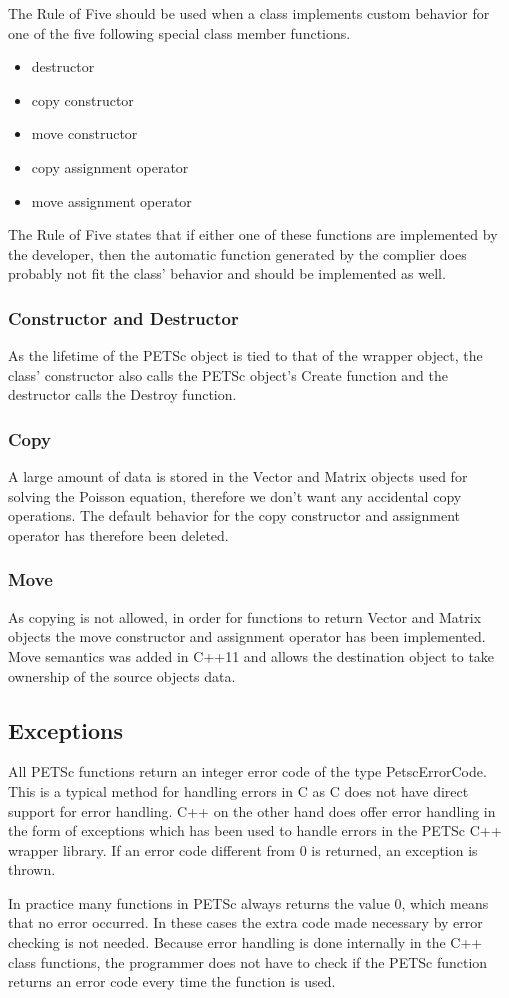 The Rule of Five should be used when a class implements custom behavior for one
of the five following special class member functions.
\begin{itemize}
	\item destructor
	\item copy constructor
	\item move constructor
	\item copy assignment operator
	\item move assignment operator
\end{itemize}
The Rule of Five states that if either one of these functions are implemented by
the developer, then the automatic function generated by the complier does
probably not fit the class' behavior and should be implemented as well.

\subsubsection{Constructor and Destructor}

As the lifetime of the PETSc object is tied to that of the wrapper object,
the class' constructor also calls the PETSc object's Create function and the 
destructor calls the Destroy function. 

\subsubsection{Copy}

A large amount of data is stored in the Vector and Matrix objects used for solving the
Poisson equation, therefore we don't want any accidental copy operations.
The default behavior for the copy constructor and assignment operator has
therefore been deleted.

\subsubsection{Move}

As copying is not allowed, in order for functions to return Vector and Matrix
objects the move constructor and assignment operator has been implemented.
Move semantics was added in C++11 and allows the destination object to take
ownership of the source objects data.

\subsection{Exceptions}

All PETSc functions return an integer error code of the type PetscErrorCode.
This is a typical method for handling errors in C as C does not have direct
support for error handling. C++ on the other hand does offer error handling in
the form of exceptions which has been used to handle errors in the PETSc C++
wrapper library. If an error code different from 0 is returned, an exception
is thrown.

In practice many functions in PETSc always returns the value 0, which means that
no error occurred. 
In these cases the extra code made necessary by error checking is not needed.
Because error handling is done internally in the C++ class functions, the
programmer does not have to check if the PETSc function returns an error code
every time the function is used.
